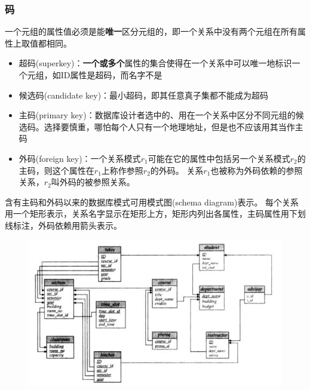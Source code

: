 \subsubsection{码}
一个元组的属性值必须是能\textbf{唯一}区分元组的，即一个关系中没有两个元组在所有属性上取值都相同。
\begin{itemize}
\item 超码(superkey)：\textbf{一个或多个}属性的集合使得在一个关系中可以唯一地标识一个元组，如ID属性是超码，而名字不是
\item 候选码(candidate key)：最小超码，即其任意真子集都不能成为超码
\item 主码(primary key)：数据库设计者选中的、用在一个关系中区分不同元组的候选码。选择要慎重，哪怕每个人只有一个地理地址，但是也不应该用其当作主码
\item 外码(foreign key)：一个关系模式$r_1$可能在它的属性中包括另一个关系模式$r_2$的主码，则这个属性在$r_1$上称作参照$r_2$的外码。
关系$r_1$也被称为外码依赖的参照关系，$r_2$叫外码的被参照关系。
\end{itemize}

含有主码和外码以来的数据库模式可用模式图(schema diagram)表示。
每个关系用一个矩形表示，关系名字显示在矩形上方，矩形内列出各属性，主码属性用下划线标注，外码依赖用箭头表示。
\begin{figure}[H]
\centering
\includegraphics[width=0.8\linewidth]{fig/university_schema_diagram.png}
\end{figure}